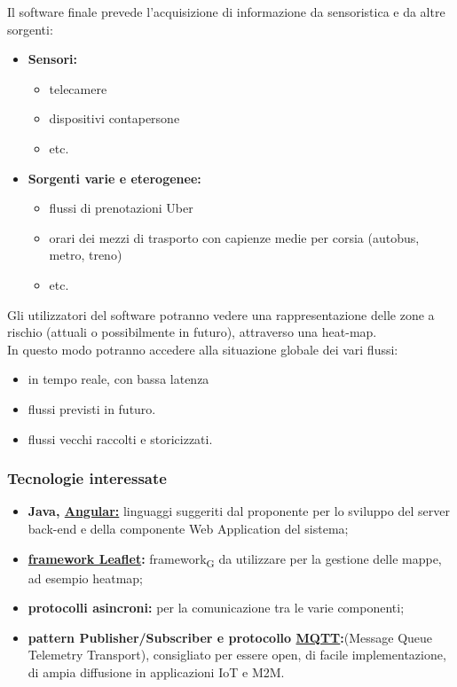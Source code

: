 Il software finale prevede l'acquisizione di informazione da sensoristica e da altre sorgenti:
\begin{itemize}
	\item{\textbf{Sensori:}}
	    \begin{itemize}
	        \item telecamere
	        \item dispositivi contapersone
	        \item etc.
	    \end{itemize}
	\item{\textbf{Sorgenti varie e eterogenee:}}
	    \begin{itemize}
	        \item flussi di prenotazioni Uber
	        \item orari dei mezzi di trasporto con capienze medie per corsia (autobus, metro, treno)
	        \item etc.
	\end{itemize}
\end{itemize}
Gli utilizzatori del software potranno vedere una rappresentazione delle zone a rischio (attuali o possibilmente in futuro), attraverso una heat-map.\\
In questo modo potranno accedere alla situazione globale dei vari flussi:
\begin{itemize}
    \item in tempo reale, con bassa latenza
    \item flussi previsti in futuro.
    \item flussi vecchi raccolti e storicizzati.
\end{itemize}


\subsubsection{Tecnologie interessate}

\begin{itemize}
	\item{\textbf{Java, \href{https://angular.io/}{Angular:}}} linguaggi suggeriti dal proponente per lo sviluppo del server back-end e della componente Web Application del sistema;
	\item{\textbf{\href{https://leafletjs.com/}{framework Leaflet}:}} framework\textsubscript{G} da utilizzare per la gestione delle mappe, ad esempio heatmap;
	\item{\textbf{protocolli asincroni:}} per la comunicazione tra le varie componenti;
	\item{\textbf{pattern Publisher/Subscriber e protocollo \href{https://mqtt.org/}{MQTT}:}}\newline (Message Queue Telemetry Transport), consigliato per essere open, di facile implementazione, di ampia diffusione in applicazioni IoT e M2M.
\end{itemize}

